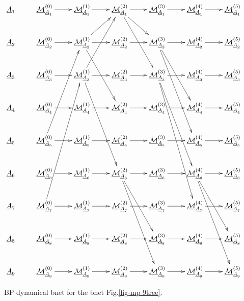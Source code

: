 \begin{figure}[h!]
$$\xymatrix{
\rvA_1 
&\ucalm^{(0)}_{\rvA_1}\ar[r]
&\ucalm^{(1)}_{\rvA_1}\ar[r]
&\ucalm^{(2)}_{\rvA_1}\ar[r]\ar[dr]\ar[ddr]
&\ucalm^{(3)}_{\rvA_1}\ar[r]
&\ucalm^{(4)}_{\rvA_1}\ar[r]
&\ucalm^{(5)}_{\rvA_1}
\\
\rvA_2 
&\ucalm^{(0)}_{\rvA_2}\ar[r]
&\ucalm^{(1)}_{\rvA_2}\ar[r]\ar[ur]\ar[ddr]
&\ucalm^{(2)}_{\rvA_2}\ar[r]
&\ucalm^{(3)}_{\rvA_2}\ar[r]\ar[ddr]\ar[dddr]
&\ucalm^{(4)}_{\rvA_2}\ar[r]
&\ucalm^{(5)}_{\rvA_2}
\\
\rvA_3 
&\ucalm^{(0)}_{\rvA_3}\ar[r]
&\ucalm^{(1)}_{\rvA_3}\ar[r]\ar[uur]\ar[dddr]
&\ucalm^{(2)}_{\rvA_3}\ar[r]
&\ucalm^{(3)}_{\rvA_3}\ar[r]\ar[dddr]\ar[ddddr]
&\ucalm^{(4)}_{\rvA_3}\ar[r]
&\ucalm^{(5)}_{\rvA_3}
\\
\rvA_4 
&\ucalm^{(0)}_{\rvA_4}\ar[r]
&\ucalm^{(1)}_{\rvA_4}\ar[r]
&\ucalm^{(2)}_{\rvA_4}\ar[r]
&\ucalm^{(3)}_{\rvA_4}\ar[r]
&\ucalm^{(4)}_{\rvA_4}\ar[r]
&\ucalm^{(5)}_{\rvA_4}
\\
\rvA_5 
&\ucalm^{(0)}_{\rvA_5}\ar[r]\ar[uuur]
&\ucalm^{(1)}_{\rvA_5}\ar[r]
&\ucalm^{(2)}_{\rvA_5}\ar[r]
&\ucalm^{(3)}_{\rvA_5}\ar[r]
&\ucalm^{(4)}_{\rvA_5}\ar[r]
&\ucalm^{(5)}_{\rvA_5}
\\
\rvA_6 
&\ucalm^{(0)}_{\rvA_6}\ar[r]
&\ucalm^{(1)}_{\rvA_6}\ar[r]
&\ucalm^{(2)}_{\rvA_6}\ar[r]\ar[ddr]\ar[dddr]
&\ucalm^{(3)}_{\rvA_6}\ar[r]
&\ucalm^{(4)}_{\rvA_6}\ar[r]\ar[ddr]\ar[dddr]
&\ucalm^{(5)}_{\rvA_6}
\\
\rvA_7 
&\ucalm^{(0)}_{\rvA_7}\ar[r]\ar[uuuur]
&\ucalm^{(1)}_{\rvA_7}\ar[r]
&\ucalm^{(2)}_{\rvA_7}\ar[r]
&\ucalm^{(3)}_{\rvA_7}\ar[r]
&\ucalm^{(4)}_{\rvA_7}\ar[r]
&\ucalm^{(5)}_{\rvA_7}
\\
\rvA_8 
&\ucalm^{(0)}_{\rvA_8}\ar[r]
&\ucalm^{(1)}_{\rvA_8}\ar[r]
&\ucalm^{(2)}_{\rvA_8}\ar[r]
&\ucalm^{(3)}_{\rvA_8}\ar[r]
&\ucalm^{(4)}_{\rvA_8}\ar[r]
&\ucalm^{(5)}_{\rvA_8}
\\
\rvA_9 
&\ucalm^{(0)}_{\rvA_9}\ar[r]
&\ucalm^{(1)}_{\rvA_9}\ar[r]
&\ucalm^{(2)}_{\rvA_9}\ar[r]
&\ucalm^{(3)}_{\rvA_9}\ar[r]
&\ucalm^{(4)}_{\rvA_9}\ar[r]
&\ucalm^{(5)}_{\rvA_9}
\\
}$$
\caption{BP dynamical bnet for the bnet
Fig.\ref{fig-mp-9tree}.}
\label{fig-propagation-9tree}
\end{figure}

